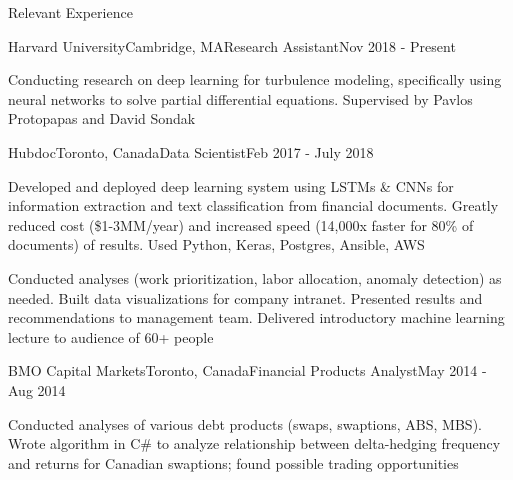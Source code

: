 \documentclass{resume} %
\begin{document}
\begin{rSection}{Relevant Experience}

\begin{rSubsection}{Harvard University}{Cambridge, MA}{Research Assistant}{Nov 2018 - Present}
\item Conducting research on deep learning for turbulence modeling, specifically using neural networks to solve partial differential equations. Supervised by Pavlos Protopapas and David Sondak
\end{rSubsection}


\begin{rSubsection}{Hubdoc}{Toronto, Canada}{Data Scientist}{Feb 2017 - July 2018}
\item Developed and deployed deep learning system using LSTMs \& CNNs for information extraction and text classification from financial documents. Greatly reduced cost (\$1-3MM/year) and increased speed (14,000x faster for 80\% of documents) of results. Used Python, Keras, Postgres, Ansible, AWS
\item Conducted analyses (work prioritization, labor allocation, anomaly detection) as needed. Built data visualizations for company intranet. Presented results and recommendations to management team. Delivered introductory machine learning lecture to audience of 60+ people
\end{rSubsection}


\begin{rSubsection}{BMO Capital Markets}{Toronto, Canada}{Financial Products Analyst}{May 2014 - Aug 2014}
\item Conducted analyses of various debt products (swaps, swaptions, ABS, MBS). Wrote algorithm in C\# to analyze relationship between delta-hedging frequency and returns for Canadian swaptions; found possible trading opportunities
\end{rSubsection}

\end{rSection}

\end{document}
